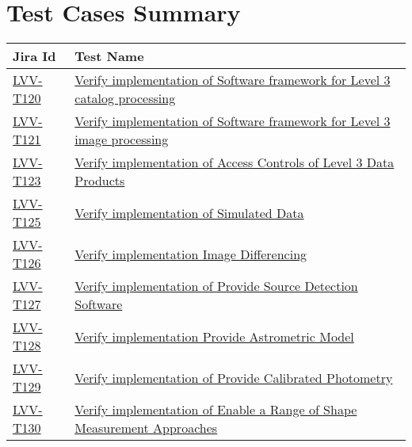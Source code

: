 \section{Test Cases Summary}\label{test-cases-summary}

\begin{longtable}[]{p{3cm}p{13cm}}
\toprule
Jira Id & Test Name\tabularnewline
\midrule
\endhead
\protect\hyperlink{lvv-t120---verify-implementation-of-software-framework-for-level-3-catalog-processing}{LVV-T120}
&
\href{https://jira.lsstcorp.org/secure/Tests.jspa\#/testCase/LVV-T120}{Verify
implementation of Software framework for Level 3 catalog
processing}\tabularnewline
\protect\hyperlink{lvv-t121---verify-implementation-of-software-framework-for-level-3-image-processing}{LVV-T121}
&
\href{https://jira.lsstcorp.org/secure/Tests.jspa\#/testCase/LVV-T121}{Verify
implementation of Software framework for Level 3 image
processing}\tabularnewline
\protect\hyperlink{lvv-t123---verify-implementation-of-access-controls-of-level-3-data-products}{LVV-T123}
&
\href{https://jira.lsstcorp.org/secure/Tests.jspa\#/testCase/LVV-T123}{Verify
implementation of Access Controls of Level 3 Data
Products}\tabularnewline
\protect\hyperlink{lvv-t125---verify-implementation-of-simulated-data}{LVV-T125}
&
\href{https://jira.lsstcorp.org/secure/Tests.jspa\#/testCase/LVV-T125}{Verify
implementation of Simulated Data}\tabularnewline
\protect\hyperlink{lvv-t126---verify-implementation--image-differencing}{LVV-T126}
&
\href{https://jira.lsstcorp.org/secure/Tests.jspa\#/testCase/LVV-T126}{Verify
implementation Image Differencing}\tabularnewline
\protect\hyperlink{lvv-t127---verify-implementation-of-provide-source-detection-software}{LVV-T127}
&
\href{https://jira.lsstcorp.org/secure/Tests.jspa\#/testCase/LVV-T127}{Verify
implementation of Provide Source Detection Software}\tabularnewline
\protect\hyperlink{lvv-t128---verify-implementation-provide-astrometric-model}{LVV-T128}
&
\href{https://jira.lsstcorp.org/secure/Tests.jspa\#/testCase/LVV-T128}{Verify
implementation Provide Astrometric Model}\tabularnewline
\protect\hyperlink{lvv-t129---verify-implementation-of-provide-calibrated-photometry}{LVV-T129}
&
\href{https://jira.lsstcorp.org/secure/Tests.jspa\#/testCase/LVV-T129}{Verify
implementation of Provide Calibrated Photometry}\tabularnewline
\protect\hyperlink{lvv-t130---verify-implementation-of-enable-a-range-of-shape-measurement-approaches}{LVV-T130}
&
\href{https://jira.lsstcorp.org/secure/Tests.jspa\#/testCase/LVV-T130}{Verify
implementation of Enable a Range of Shape Measurement
Approaches}\tabularnewline

\end{longtable}
